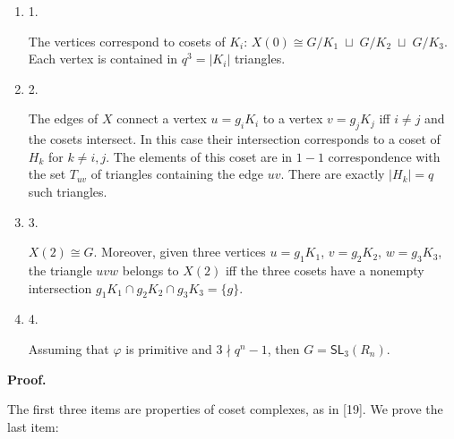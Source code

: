 \documentclass[10pt,a4paper]{article}
\begin{document}
\begin{enumerate}


\item[] 
1. 


The vertices correspond to cosets of $K_{i}$: $X(0)\cong G/K_{1}\;\sqcup\;G/K_{2}\;\sqcup\;G/K_{3}$. Each vertex is contained in $q^{3}=|K_{i}|$ triangles.\par





\item[] 
2. 


The edges of $X$ connect a vertex $u=g_{i}K_{i}$ to a vertex $v=g_{j}K_{j}$ iff $i\neq j$ and the cosets intersect. In this case their intersection corresponds to a coset of $H_{k}$ for $k\neq i,j$. The elements of this coset are in $1-1$ correspondence with the set $T_{uv}$ of triangles containing the edge $uv$. There are exactly $|H_{k}|=q$ such triangles.\par





\item[] 
3. 


$X(2)\cong G$. Moreover, given three vertices $u=g_{1}K_{1}$, $v=g_{2}K_{2}$, $w=g_{3}K_{3}$, the triangle $uvw$ belongs to $X(2)$ iff the three cosets have a nonempty intersection $g_{1}K_{1}\cap g_{2}K_{2}\cap g_{3}K_{3}=\{g\}$.\par





\item[] 
4. 


Assuming that $\varphi$ is primitive and $3\nmid q^{n}-1$, then $G=\mathsf{SL}_{3}(R_{n})$.\par





\end{enumerate}






\par\medskip\noindent\textbf{
\textbf{Proof}.}\par




The first three items are properties of coset complexes, as in [19]. We prove the last item:\par
\end{document}
